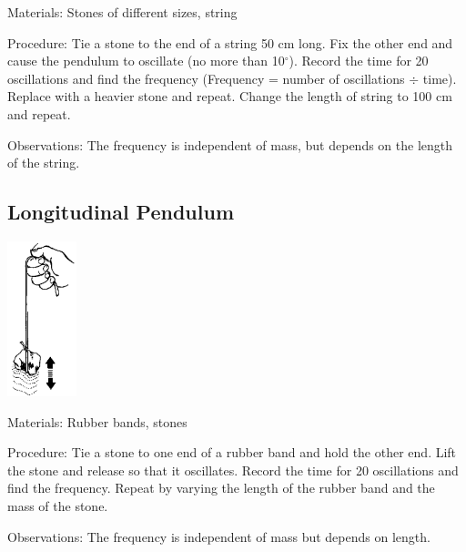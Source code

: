 \begin{multicols}{2}
\begin{description*}
\item[Materials:]{Stones of different sizes, string}
\item[Procedure:]{Tie a stone to the end of a string 50 cm long. Fix the other end and cause the pendulum to oscillate (no more than 10$^\circ$). Record the time for 20 oscillations and find the frequency (Frequency = number of oscillations $\div$ time). Replace with a heavier stone and repeat. Change the length of string to 100 cm and repeat.}
\item[Observations:]{The frequency is independent of mass, but depends on the length of the string.}
\end{description*}

\subsection{Longitudinal Pendulum}

\begin{center}
\includegraphics[width=0.15\textwidth]{./img/source/longitudinal-pendulum.png}
\end{center}

\begin{description*}
\item[Materials:]{Rubber bands, stones}
\item[Procedure:]{Tie a stone to one end of a rubber band and hold the other end. Lift the stone and release so that it oscillates. Record the time for 20 oscillations and find the frequency. Repeat by varying the length of the rubber band and the mass of the stone.}
\item[Observations:]{The frequency is independent of mass but depends on length.}
\end{description*}


\end{multicols}
